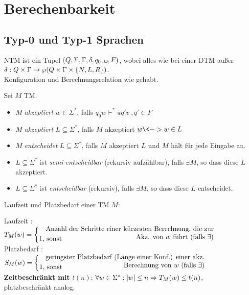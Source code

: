 \section[Berechenbarkeit]{Berechenbarkeit}
\subsection{Typ-0 und Typ-1 Sprachen}
\begin{Def}[name={[NTM]}]
	\acf{NTM} ist ein Tupel $(Q,\Sigma,\Gamma,\delta,q_0,\blank,F)$, wobei alles wie bei einer \ac{DTM} außer $\delta: Q\x\Gamma\-> \wp(Q\x\Gamma\x\{N,L,R\})$.\\
	Konfiguration und Berechnungsrelation wie gehabt.
\end{Def}

\begin{Def}[name={[Eigenschaften einer \acs*{TM} bzgl. Sprachen]}]
	Sei $M$ \ac{TM}.
	\begin{itemize}
	\item $M$ \emph{akzeptiert} $w\in\Sigma^*$, falls $q_0w \vdash^* uq'v \ ,q'\in F$
	\item $M$ \emph{akzeptiert} $L\subseteq\Sigma^*$, falls $M$ akzeptiert $w \<-> w\in L$
	\item $M$ \emph{entscheidet} $L\subseteq\Sigma^*$, falls $M$ akzeptiert $L$ und $M$ hält für jede Eingabe an.
	\item $L\subseteq\Sigma^*$ ist \emph{semi-entscheidbar} (rekursiv aufzählbar), falls $\exists M$, so dass diese $L$ akzeptiert.
	\item $L\subseteq\Sigma^*$ ist \emph{entscheidbar} (rekursiv), falls $\exists M$, so dass diese $L$ entscheidet.
	\end{itemize}
\end{Def}
\begin{Def}[name={[Laufzeit und Platzbedarf einer \acs*{TM}]}]
	Laufzeit und Platzbedarf einer \ac{TM} $M:$
	
	Laufzeit : $T_M(w) =
	\begin{cases}
		\parbox{.74\textwidth}{\raggedleft Anzahl der Schritte einer kürzesten Berechnung, die zur Akz. von $w$ führt (falls $\exists$)}\\[-1em]
		\text{1, sonst}
	\end{cases}
	$\\
	Platzbedarf : $S_M(w) =
	\begin{cases}
		\parbox{.7\textwidth}{\raggedleft geringster Platzbedarf (Länge einer Konf.) einer akz. Berechnung von $w$ (falls $\exists$)}\\[-1em]
		\text{1, sonst}
	\end{cases}
	$
\textbf{Zeitbeschränkt mit $t(n)$}: $\forall w\in\Sigma^*: |w|\leq n \=> T_M(w)\leq t(n)$,\\
platzbeschränkt analog.
\end{Def}
